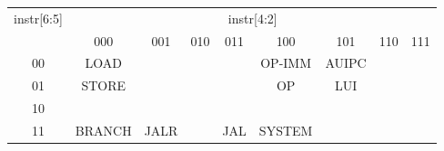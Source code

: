 \documentclass[preview]{standalone}
\author{Qzlzdy}
\begin{document}
  \begin{tabular}{|c|c|c|c|c|c|c|c|c|}
    \hline
    \multirow{2}{*}{instr[6:5]} & \multicolumn{8}{|c|}{instr[4:2]} \\
    \cline{2-9}
    & 000 & 001 & 010 & 011 & 100 & 101 & 110 & 111 \\
    \hline
    00 & LOAD & & & & OP-IMM & AUIPC & & \\
    \hline
    01 & STORE & & & & OP & LUI & & \\
    \hline
    10 & & & & & & & & \\
    \hline
    11 & BRANCH & JALR & & JAL & SYSTEM & & & \\
    \hline
  \end{tabular}
\end{document}
